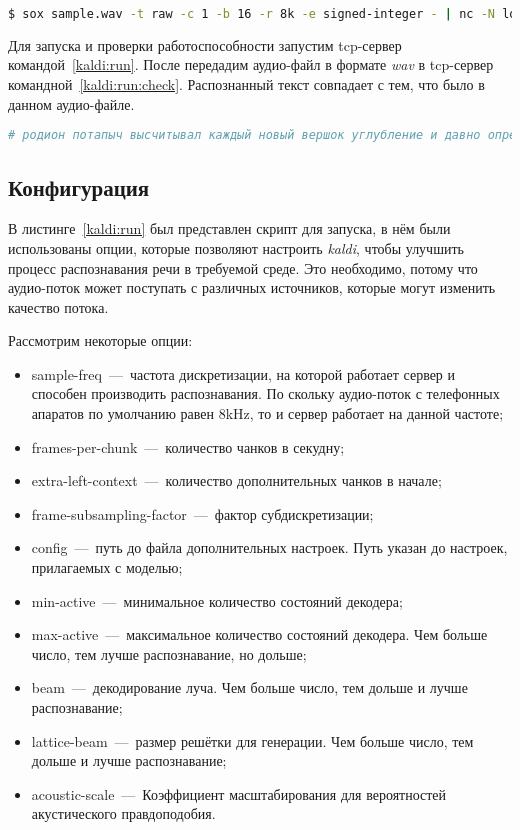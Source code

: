 \begin{lstlisting}[caption={Передача аудио-файла на распознавание речи},label={kaldi:run:check},language=bash]
$ sox sample.wav -t raw -c 1 -b 16 -r 8k -e signed-integer - | nc -N localhost 5050
\end{lstlisting}

Для запуска и проверки работоспособности запустим tcp-сервер командой~\ref{kaldi:run}.
После передадим аудио-файл в формате \textit{wav} в tcp-сервер командной~\ref{kaldi:run:check}.
Распознанный текст совпадает с тем, что было в данном аудио-файле.

\begin{minipage}{\linewidth}
\begin{lstlisting}[caption={Результат работы сервера распознавания речи}, label={kaldi:run:res},language=bash]
# родион потапыч высчитывал каждый новый вершок углубление и давно определил про себя
\end{lstlisting}
\end{minipage}

\subsection{Конфигурация}

В листинге~\ref{kaldi:run} был представлен скрипт для запуска, в нём были
использованы опции, которые позволяют настроить \textit{kaldi}, чтобы улучшить
процесс распознавания речи в требуемой среде. Это необходимо, потому что
аудио-поток может поступать с различных источников, которые могут изменить качество
потока.

Рассмотрим некоторые опции:
\begin{itemize}
    \item sample-freq~---~частота дискретизации, на которой работает сервер и способен производить распознавания.
        По скольку аудио-поток с телефонных апаратов по умолчанию равен 8kHz, то и сервер работает на данной частоте;
    \item frames-per-chunk~---~количество чанков в секудну;
    \item extra-left-context~---~количество дополнительных чанков в начале;
    \item frame-subsampling-factor~---~фактор субдискретизации;
    \item config~---~путь до файла дополнительных настроек. Путь указан до настроек, прилагаемых с моделью;
    \item min-active~---~минимальное количество состояний декодера;
    \item max-active~---~максимальное количество состояний декодера. Чем больше число, тем лучше распознавание, но дольше;
    \item beam~---~декодирование луча. Чем больше число, тем дольше и лучше распознавание;
    \item lattice-beam~---~размер решётки для генерации. Чем больше число, тем дольше и лучше распознавание;
    \item acoustic-scale~---~Коэффициент масштабирования для вероятностей акустического правдоподобия.
\end{itemize}
